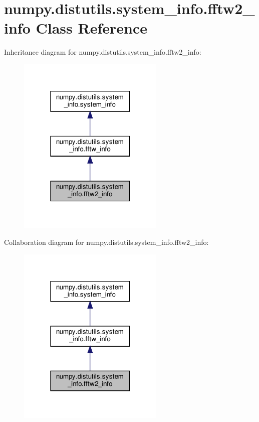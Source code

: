 \hypertarget{classnumpy_1_1distutils_1_1system__info_1_1fftw2__info}{}\section{numpy.\+distutils.\+system\+\_\+info.\+fftw2\+\_\+info Class Reference}
\label{classnumpy_1_1distutils_1_1system__info_1_1fftw2__info}


Inheritance diagram for numpy.\+distutils.\+system\+\_\+info.\+fftw2\+\_\+info\+:
\nopagebreak
\begin{figure}[H]
\begin{center}
\leavevmode
\includegraphics[width=198pt]{classnumpy_1_1distutils_1_1system__info_1_1fftw2__info__inherit__graph}
\end{center}
\end{figure}


Collaboration diagram for numpy.\+distutils.\+system\+\_\+info.\+fftw2\+\_\+info\+:
\nopagebreak
\begin{figure}[H]
\begin{center}
\leavevmode
\includegraphics[width=198pt]{classnumpy_1_1distutils_1_1system__info_1_1fftw2__info__coll__graph}
\end{center}
\end{figure}

